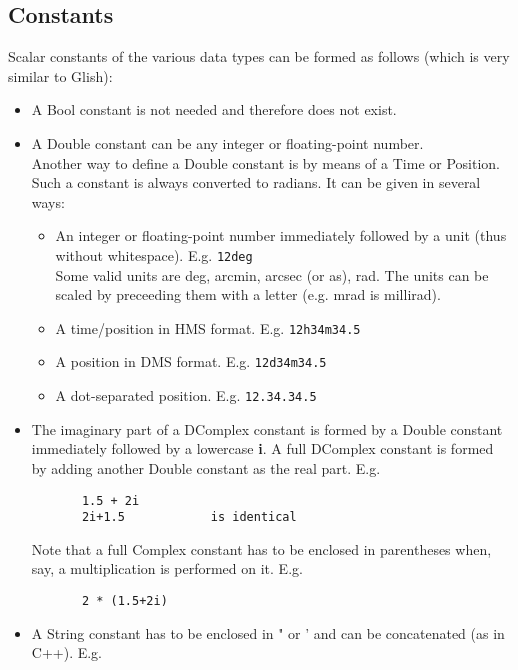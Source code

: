 \subsection{\label{TAQL:CONSTANTS}Constants}
Scalar constants of the various data types can be formed as follows
(which is very similar to Glish):
\begin{itemize}
  \item A Bool constant is not needed and therefore does not exist.
  \item A Double constant can be any integer or floating-point number.
       \\Another way to define a Double constant is by means of
       a Time or Position. Such a constant is always converted to radians.
       It can be given in several ways:
       \begin{itemize}
         \item An integer or floating-point number immediately
              followed by a unit
              (thus without whitespace). E.g. \texttt{12deg}
              \\Some valid units are deg, arcmin, arcsec (or as), rad.
              The units can be scaled by preceeding them with a letter
              (e.g. mrad is millirad).
         \item A time/position in HMS format.
              E.g. \texttt{12h34m34.5}
         \item A position in DMS format.
              E.g. \texttt{12d34m34.5}
         \item A dot-separated position.
              E.g. \texttt{12.34.34.5}
       \end{itemize}
  \item The imaginary part of a DComplex constant is formed by a Double
       constant immediately followed by a lowercase \textbf{i}. A full DComplex
       constant is formed by adding another Double constant as the
       real part. E.g.
       \begin{verbatim}
       1.5 + 2i
       2i+1.5            is identical
       \end{verbatim}
       Note that a full Complex constant has to be enclosed
       in parentheses when, say, a multiplication is performed on it. E.g.
       \begin{verbatim}
       2 * (1.5+2i)
       \end{verbatim}
  \item A String constant has to be enclosed in " or ' and can be
       concatenated (as in C++). E.g.
       \begin{verbatim}

\end{verbatim}
\end{itemize}
